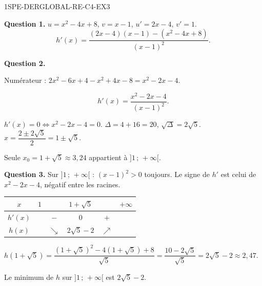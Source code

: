 
\begin{corrige}{1SPE-DERGLOBAL-RE-C4-EX3}

\textbf{Question 1.}
$u = x^2 - 4x + 8$, $v = x-1$, $u' = 2x-4$, $v' = 1$.
\[
h'(x) = \frac{(2x-4)(x-1) - (x^2-4x+8)}{(x-1)^2}.
\]

\textbf{Question 2.}


Numérateur : $2x^2 - 6x + 4 - x^2 + 4x - 8 = x^2 - 2x - 4.$

\[
h'(x) = \frac{x^2 - 2x - 4}{(x-1)^2}.
\]

$h'(x) = 0 \Leftrightarrow x^2 - 2x - 4 = 0.$
$\Delta = 4 + 16 = 20$, $\sqrt{\Delta} = 2\sqrt{5}$.
$x = \dfrac{2 \pm 2\sqrt{5}}{2} = 1 \pm \sqrt{5}.$

Seule $x_0 = 1 + \sqrt{5} \approx 3{,}24$ appartient à $]1\,;\,+\infty[$.

\textbf{Question 3.}
Sur $]1\,;\,+\infty[$ : $(x-1)^2 > 0$ toujours. Le signe de $h'$ est celui de $x^2-2x-4$, négatif entre les racines.

\begin{center}
\begin{tabular}{|c|ccccc|}
\hline
$x$ & $1$ & & $1+\sqrt{5}$ & & $+\infty$ \\
\hline
$h'(x)$ & & $-$ & $0$ & $+$ & \\
\hline
$h(x)$ & & $\searrow$ & $2\sqrt{5}-2$ & $\nearrow$ & \\
\hline
\end{tabular}
\end{center}

$h(1+\sqrt{5}) = \dfrac{(1+\sqrt{5})^2 - 4(1+\sqrt{5})+8}{\sqrt{5}} = \dfrac{10-2\sqrt{5}}{\sqrt{5}} = 2\sqrt{5}-2 \approx 2{,}47.$

Le minimum de $h$ sur $]1\,;\,+\infty[$ est $2\sqrt{5}-2$.

\end{corrige}
